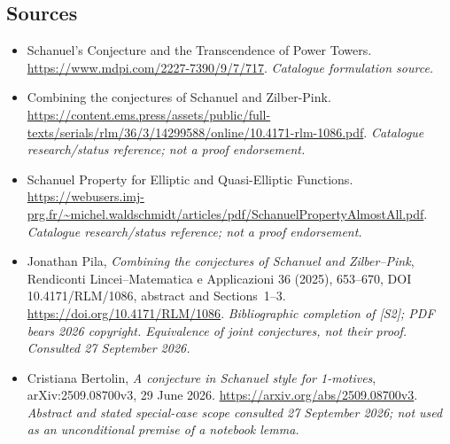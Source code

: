 \documentclass[11pt,a4paper]{article}
\numberwithin{equation}{section}
\begin{document}
\subsection{Sources}
\begin{itemize}\raggedright
\item[\textnormal{[S1]}]\hypertarget{source:statement:1}{} Schanuel's Conjecture and the Transcendence of Power Towers.
\url{https://www.mdpi.com/2227-7390/9/7/717}.
{\small\textit{Catalogue formulation source.}}
\item[\textnormal{[S2]}]\hypertarget{source:statement:2}{} Combining the conjectures of Schanuel and Zilber-Pink.
\url{https://content.ems.press/assets/public/full-texts/serials/rlm/36/3/14299588/online/10.4171-rlm-1086.pdf}.
{\small\textit{Catalogue research/status reference; not a proof endorsement.}}
\item[\textnormal{[S3]}]\hypertarget{source:statement:3}{} Schanuel Property for Elliptic and Quasi-Elliptic Functions.
\url{https://webusers.imj-prg.fr/~michel.waldschmidt/articles/pdf/SchanuelPropertyAlmostAll.pdf}.
{\small\textit{Catalogue research/status reference; not a proof endorsement.}}
\item[\textnormal{[E1]}]\hypertarget{extra:statement:1}{} Jonathan Pila,
\emph{Combining the conjectures of Schanuel and Zilber--Pink},
Rendiconti Lincei--Matematica e Applicazioni 36 (2025), 653--670,
DOI 10.4171/RLM/1086, abstract and Sections~1--3.
\url{https://doi.org/10.4171/RLM/1086}.
{\small\textit{Bibliographic completion of [S2]; PDF bears 2026 copyright.
Equivalence of joint conjectures, not their proof. Consulted 27 September 2026.}}
\item[\textnormal{[E2]}]\hypertarget{extra:statement:2}{} Cristiana Bertolin,
\emph{A conjecture in Schanuel style for 1-motives},
arXiv:2509.08700v3, 29 June 2026.
\url{https://arxiv.org/abs/2509.08700v3}.
{\small\textit{Abstract and stated special-case scope consulted
27 September 2026; not used as an unconditional premise of a notebook lemma.}}

\end{itemize}

\end{document}
